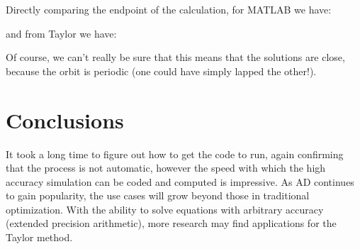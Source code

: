 \documentclass[11pt]{article}
\begin{document}
Directly comparing the endpoint of the calculation, for MATLAB we have:

and from Taylor we have:


Of course, we can't really be sure that this means that the solutions are close, because the orbit is periodic (one could have simply lapped the other!).

\pagebreak
\section{Conclusions}

It took a long time to figure out how to get the code to run, again confirming that the process is not automatic, however the speed with which the high accuracy simulation can be coded and computed is impressive.
As AD continues to gain popularity, the use cases will grow beyond those in traditional optimization.
With the ability to solve equations with arbitrary accuracy (extended precision arithmetic), more research may find applications for the Taylor method.




\pagebreak
\nocite{bischof2000computing}
\nocite{gay2006semiautomatic}
\nocite{griewank2003mathematical}
\nocite{pryce2008fast}
\nocite{barrio2005performance}
\nocite{jorba2005software}
\nocite{verma2000introduction}
\nocite{walther2012getting}



\end{document}
